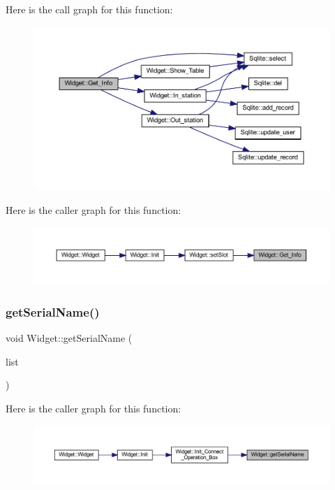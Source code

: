 Here is the call graph for this function\+:
\nopagebreak
\begin{figure}[H]
\begin{center}
\leavevmode
\includegraphics[width=350pt]{class_widget_a25fcbea5c404362947c24794373a0968_cgraph}
\end{center}
\end{figure}
Here is the caller graph for this function\+:
\nopagebreak
\begin{figure}[H]
\begin{center}
\leavevmode
\includegraphics[width=350pt]{class_widget_a25fcbea5c404362947c24794373a0968_icgraph}
\end{center}
\end{figure}
\mbox{\label{class_widget_afb97de9294ffdbb2c64ed1f96aea9261}} 
\subsubsection{\texorpdfstring{getSerialName()}{getSerialName()}}
{\footnotesize\ttfamily void Widget\+::get\+Serial\+Name (\begin{DoxyParamCaption}\item[{Q\+String\+List $\ast$}]{list }\end{DoxyParamCaption})}

Here is the caller graph for this function\+:
\nopagebreak
\begin{figure}[H]
\begin{center}
\leavevmode
\includegraphics[width=350pt]{class_widget_afb97de9294ffdbb2c64ed1f96aea9261_icgraph}
\end{center}
\end{figure}
\mbox{\label{class_widget_a9dc8ecbea303faeb17e08ef888754cf9}} 
